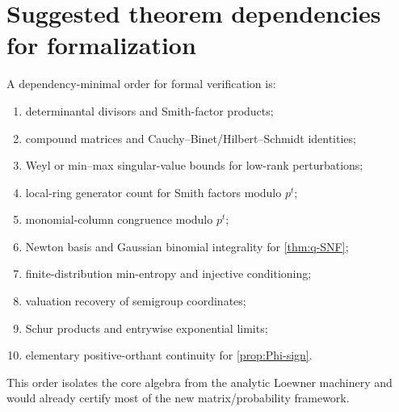 \documentclass[11pt,oneside]{article}
\theoremstyle{definition}
\theoremstyle{remark}
\begin{document}
\section{Suggested theorem dependencies for formalization}
\label{app:formalization}

A dependency-minimal order for formal verification is:
\begin{enumerate}
\item determinantal divisors and Smith-factor products;
\item compound matrices and Cauchy--Binet/Hilbert--Schmidt identities;
\item Weyl or min--max singular-value bounds for low-rank perturbations;
\item local-ring generator count for Smith factors modulo $p^t$;
\item monomial-column congruence modulo $p^t$;
\item Newton basis and Gaussian binomial integrality for \cref{thm:q-SNF};
\item finite-distribution min-entropy and injective conditioning;
\item valuation recovery of semigroup coordinates;
\item Schur products and entrywise exponential limits;
\item elementary positive-orthant continuity for \cref{prop:Phi-sign}.
\end{enumerate}
This order isolates the core algebra from the analytic Loewner machinery and would already certify most of the new matrix/probability framework.
\end{document}
